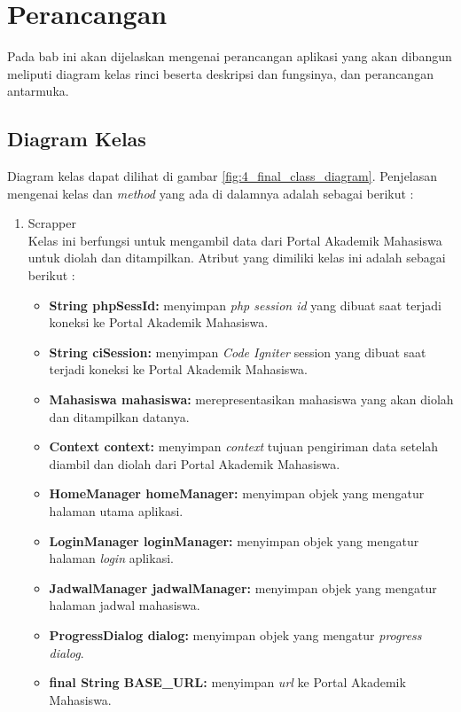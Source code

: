 \chapter{Perancangan}
\label{chap:perancangan}

Pada bab ini akan dijelaskan mengenai perancangan aplikasi yang akan dibangun meliputi diagram kelas rinci beserta deskripsi dan fungsinya, dan perancangan antarmuka.

\section{Diagram Kelas}
Diagram kelas dapat dilihat di gambar \ref{fig:4_final_class_diagram}. Penjelasan mengenai kelas dan \textit{method} yang ada di dalamnya adalah sebagai berikut :

\begin{enumerate}
		\item Scrapper\\
		Kelas ini berfungsi untuk mengambil data dari Portal Akademik Mahasiswa untuk diolah dan ditampilkan. Atribut yang dimiliki kelas ini adalah sebagai berikut :
		\begin{itemize}
			\item \textbf{String phpSessId:} menyimpan \textit{php session id} yang dibuat saat terjadi koneksi ke Portal Akademik Mahasiswa.
			\item \textbf{String ciSession:} menyimpan \textit{Code Igniter} session yang dibuat saat terjadi koneksi ke Portal Akademik Mahasiswa.
            \item \textbf{Mahasiswa mahasiswa:} merepresentasikan mahasiswa yang akan diolah dan ditampilkan datanya.
            \item \textbf{Context context:} menyimpan \textit{context} tujuan pengiriman data setelah diambil dan diolah dari Portal Akademik Mahasiswa.
            \item \textbf{HomeManager homeManager:} menyimpan objek yang mengatur halaman utama aplikasi.
            \item \textbf{LoginManager loginManager:} menyimpan objek yang mengatur halaman \textit{login} aplikasi.
            \item \textbf{JadwalManager jadwalManager:} menyimpan objek yang mengatur halaman jadwal mahasiswa.
            \item \textbf{ProgressDialog dialog:} menyimpan objek yang mengatur \textit{progress dialog}.
            \item \textbf{final String BASE_URL:} menyimpan \textit{url} ke Portal Akademik Mahasiswa.

\end{itemize}
\end{enumerate}
